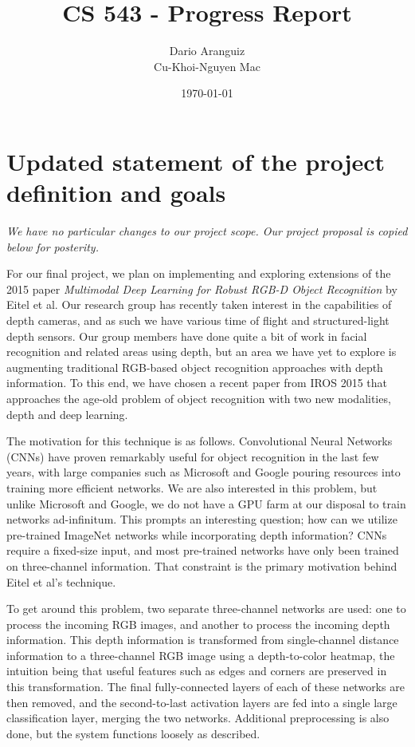 \documentclass[paper=letter, fontsize=12pt]{article}
\title{CS 543 - Progress Report}
\author{
        Dario Aranguiz \\
        Cu-Khoi-Nguyen Mac
        }
\date{\today}
\begin{document}
\maketitle

\section{Updated statement of the project definition and goals}

\textit{We have no particular changes to our project scope. Our project
proposal is copied below for posterity.}

For our final project, we plan on implementing and exploring extensions of the
2015 paper \textit{Multimodal Deep Learning for Robust RGB-D Object
Recognition} \cite{Eitel2015} by Eitel et al. Our research group has recently
taken interest in the capabilities of depth cameras, and as such we have
various time of flight and structured-light depth sensors. Our group members
have done quite a bit of work in facial recognition and related areas using
depth, but an area we have yet to explore is augmenting traditional RGB-based
object recognition approaches with depth information. To this end, we have
chosen a recent paper from IROS 2015 that approaches the age-old problem of
object recognition with two new modalities, depth and deep learning.

The motivation for this technique is as follows. Convolutional Neural Networks
(CNNs) have proven remarkably useful for object recognition in the last few
years, with large companies such as Microsoft and Google pouring resources
into training more efficient networks. We are also interested in this problem,
but unlike Microsoft and Google, we do not have a GPU farm at our disposal to
train networks ad-infinitum. This prompts an interesting question; how can we
utilize pre-trained ImageNet networks while incorporating depth information?
CNNs require a fixed-size input, and most pre-trained networks have only been
trained on three-channel information. That constraint is the primary
motivation behind Eitel et al's technique.

To get around this problem, two separate three-channel networks are used: one
to process the incoming RGB images, and another to process the incoming depth
information. This depth information is transformed from single-channel
distance information to a three-channel RGB image using a depth-to-color
heatmap, the intuition being that useful features such as edges and corners
are preserved in this transformation. The final fully-connected layers of each
of these networks are then removed, and the second-to-last activation layers
are fed into a single large classification layer, merging the two networks.
Additional preprocessing is also done, but the system functions loosely as
described.
\end{document}

